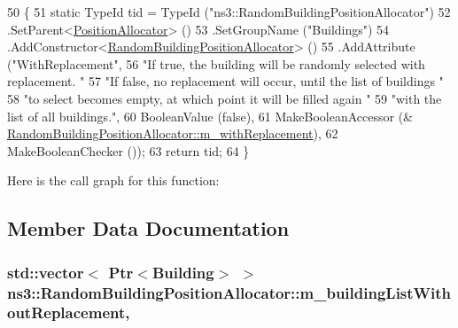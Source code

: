 \begin{DoxyCode}
50 \{
51   \textcolor{keyword}{static} TypeId tid = TypeId (\textcolor{stringliteral}{"ns3::RandomBuildingPositionAllocator"})
52     .SetParent<\hyperlink{classns3_1_1PositionAllocator_a944cf6b97b874e06983c1f3e81cf3ea6}{PositionAllocator}> ()
53     .SetGroupName (\textcolor{stringliteral}{"Buildings"})
54     .AddConstructor<\hyperlink{classns3_1_1RandomBuildingPositionAllocator_af82ab557d396b26ffcbb5fe22d85a7d3}{RandomBuildingPositionAllocator}> ()
55     .AddAttribute (\textcolor{stringliteral}{"WithReplacement"},
56                    \textcolor{stringliteral}{"If true, the building will be randomly selected with replacement. "}
57                    \textcolor{stringliteral}{"If false, no replacement will occur, until the list of buildings "}
58                    \textcolor{stringliteral}{"to select becomes empty, at which point it will be filled again "}
59                    \textcolor{stringliteral}{"with the list of all buildings."},
60                    BooleanValue (\textcolor{keyword}{false}),
61                    MakeBooleanAccessor (&
      \hyperlink{classns3_1_1RandomBuildingPositionAllocator_a3bfc96cc1609a7cbaa2a1b4de3050dc2}{RandomBuildingPositionAllocator::m\_withReplacement}),
62                    MakeBooleanChecker ());
63   \textcolor{keywordflow}{return} tid;
64 \}
\end{DoxyCode}


Here is the call graph for this function\+:




\subsection{Member Data Documentation}
\subsubsection[{\texorpdfstring{m\+\_\+building\+List\+Without\+Replacement}{m_buildingListWithoutReplacement}}]{\setlength{\rightskip}{0pt plus 5cm}std\+::vector$<$ {\bf Ptr}$<${\bf Building}$>$ $>$ ns3\+::\+Random\+Building\+Position\+Allocator\+::m\+\_\+building\+List\+Without\+Replacement\hspace{0.3cm}{\ttfamily [mutable]}, {\ttfamily [private]}}\hypertarget{classns3_1_1RandomBuildingPositionAllocator_af7ff0d4763c749e46456b4e97540b887}{}\label{classns3_1_1RandomBuildingPositionAllocator_af7ff0d4763c749e46456b4e97540b887}
